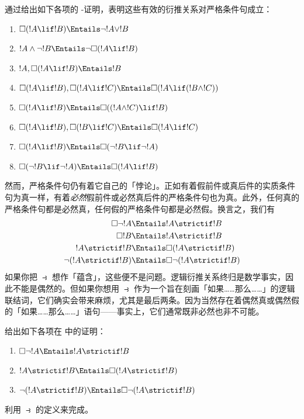 \documentclass[../../../include/open-logic-section]{subfiles}
\begin{document}
\begin{prob}
  通过给出如下各项的 -证明，表明这些有效的衍推关系对严格条件句成立：
  \begin{enumerate}
  \item  $\Box(!A \lif !B) \Entails \lnot !A \lor !B$
  \item $!A \land \lnot !B \Entails \lnot\Box(!A \lif !B)$
  \item $!A, \Box(!A \lif !B) \Entails !B$
  \item $\Box(!A \lif !B), \Box(!A \lif !C) \Entails \Box(!A \lif (!B
    \land !C))$
  \item $\Box(!A \lif !B) \Entails \Box((!A \land !C) \lif !B)$
  \item $\Box(!A \lif !B), \Box(!B \lif !C) \Entails \Box(!A
    \lif !C)$
  \item $\Box(!A \lif !B) \Entails \Box(\lnot !B \lif \lnot !A)$
  \item $\Box(\lnot !B \lif \lnot !A) \Entails \Box(!A \lif !B)$
  \end{enumerate}
  \end{prob}

然而，严格条件句仍有着它自己的「悖论」。正如有着假前件或真后件的实质条件句为真一样，有着\emph{必然}假前件或必然真后件的严格条件句也为真。此外，任何真的严格条件句都是必然真，任何假的严格条件句都是必然假。换言之，我们有
\begin{align}
  \Box \lnot !A & \Entails !A \strictif !B\\
  \Box !B & \Entails !A \strictif !B\\
  !A \strictif !B& \Entails \Box(!A \strictif !B)\\
  \lnot(!A \strictif !B) & \Entails \Box\lnot(!A \strictif !B)
\end{align}
如果你把 $\strictif$ 想作「蕴含」，这些便不是问题。逻辑衍推关系终归是数学事实，因此不能是偶然的。但如果你想用 $\strictif$ 作为一个旨在刻画「如果……那么……」的逻辑联结词，它们确实会带来麻烦，尤其是最后两条。因为当然存在着偶然真或偶然假的「如果……那么……」语句——事实上，它们通常既非必然也非不可能。

\begin{prob}
  给出如下各项在  中的证明：
  \begin{enumerate}
    \item  $\Box \lnot !A \Entails !A \strictif !B$
    \item $!A \strictif !B \Entails \Box(!A \strictif !B)$
    \item $\lnot(!A \strictif !B)  \Entails \Box\lnot(!A \strictif !B)$
  \end{enumerate}
  利用 $\strictif$ 的定义来完成。
\end{prob}
\end{document}
